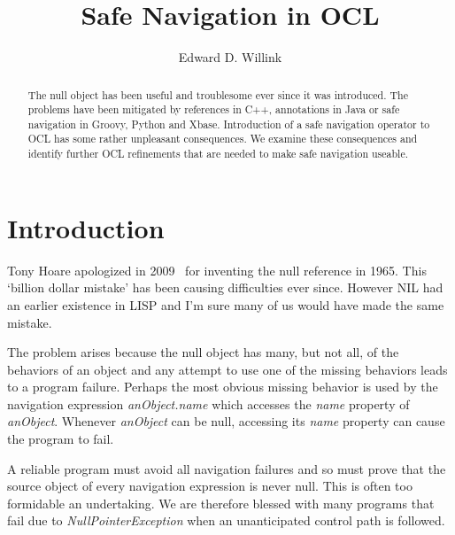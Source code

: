 \documentclass{llncs}
\begin{document}
%
\mainmatter              %
%
\title{Safe Navigation in OCL}
%
%
\author{Edward D. Willink}
%
%
%


\maketitle              %

\begin{abstract}
The null object has been useful and troublesome ever since it was introduced.
The problems have been mitigated by references in C++, annotations in Java or safe navigation in Groovy, Python and Xbase.
Introduction of a safe navigation operator to OCL has some rather unpleasant consequences. We examine these
consequences and identify further OCL refinements that are needed to make safe navigation useable.

\end{abstract}
%
\section{Introduction}
%
Tony Hoare apologized in 2009~\cite{Hoare-mistake} for inventing the null reference in 1965. This `billion dollar mistake' has been causing difficulties ever since. However NIL had an earlier existence in LISP and I'm sure many of us would have made the same mistake.

The problem arises because the null object has many, but not all, of the behaviors of an object and any attempt to use one of the missing behaviors leads to a program failure. Perhaps the most obvious missing behavior is used by the navigation expression \emph{anObject.name} which accesses the \emph{name} property of \emph{anObject}. Whenever \emph{anObject} can be null, accessing its \emph{name} property can cause the program to fail.

A reliable program must avoid all navigation failures and so must prove that the source object of every navigation expression is never null. This is often too formidable an undertaking. We are therefore blessed with many programs that fail due to \emph{NullPointerException} when an unanticipated control path is followed.
\end{document}
